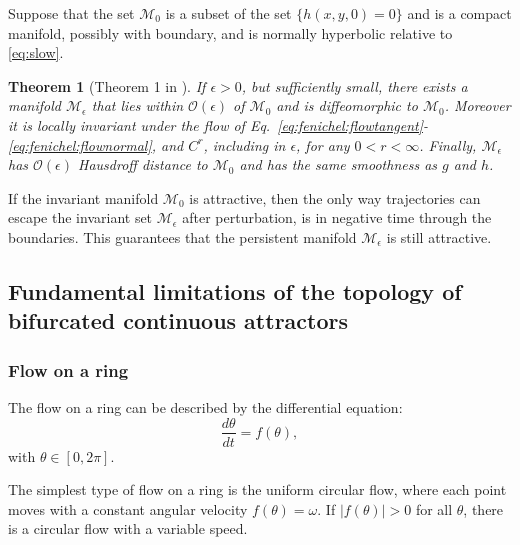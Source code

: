 \documentclass{article} %
\newcounter{ct}
\newcommand{\manifold}{\mathcal{M}}
\newtheorem{theorem}{Theorem}
\theoremstyle{definition}
\theoremstyle{remark}
\begin{document}
Suppose that the set \(\manifold_0\)  is a subset of the set \(\{h(x, y, 0) = 0\}\) and is a compact manifold, possibly with boundary, and is normally hyperbolic relative to \ref{eq:slow}.


\begin{theorem}[Theorem 1 in \citep{Jones1995}]\label{theorem:originalpersistent}
If \(\epsilon >0\), but sufficiently small, there exists a manifold \(\manifold_\epsilon\) that lies within \(\mathcal{O}(\epsilon)\) of \(\manifold_0\) and is diffeomorphic to \(\manifold_0\).
 Moreover it is locally invariant under the flow of Eq.~\ref{eq:fenichel:flowtangent}-\ref{eq:fenichel:flownormal}, and \(C^r\), including in \(\epsilon\), for any \(0<r< \infty\).
 Finally, \(\manifold_\epsilon\) has \(\mathcal{O}(\epsilon)\) Hausdroff distance to \(\manifold_0\) and has the same smoothness as \(g\) and \(h\). 
\end{theorem}


If the invariant manifold \(\manifold_0\) is attractive, then the only way trajectories can escape the invariant set \(\manifold_\epsilon\) after perturbation, is in negative time through the boundaries.
This guarantees that the persistent manifold \(\manifold_\epsilon\) is still attractive.


\subsection{Fundamental limitations of the topology of bifurcated continuous attractors}

\subsubsection{Flow on a ring}
The flow on a ring can be described by the differential equation\citep{hirsch2013differential}:
\begin{equation}
\frac{d\theta}{dt} = f(\theta),
\end{equation}
with \(\theta\in[0,2\pi].\)

The simplest type of flow on a ring is the uniform circular flow, where each point moves with a constant angular velocity \(f(\theta)=\omega\).
If \(|f(\theta)|>0\) for all \(\theta\), there is a circular flow with a variable speed.
\end{document}
